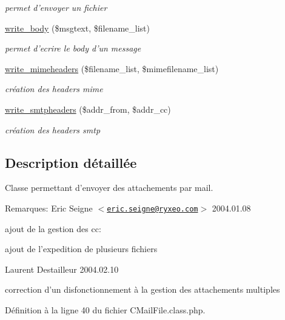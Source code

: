 \begin{CompactItemize}
\begin{CompactList}\small\item\em permet d'envoyer un fichier \item\end{CompactList}\item 
\hyperlink{classCMailFile_a4}{write\_\-body} (\$msgtext, \$filename\_\-list)
\begin{CompactList}\small\item\em permet d'ecrire le body d'un message \item\end{CompactList}\item 
\hyperlink{classCMailFile_a5}{write\_\-mimeheaders} (\$filename\_\-list, \$mimefilename\_\-list)
\begin{CompactList}\small\item\em cr\'{e}ation des headers mime \item\end{CompactList}\item 
\hyperlink{classCMailFile_a6}{write\_\-smtpheaders} (\$addr\_\-from, \$addr\_\-cc)
\begin{CompactList}\small\item\em cr\'{e}ation des headers smtp \item\end{CompactList}\end{CompactItemize}


\subsection{Description d\'{e}taill\'{e}e}
Classe permettant d'envoyer des attachements par mail. 

\begin{Desc}
\item[Remarques:]Eric Seigne $<$\href{mailto:eric.seigne@ryxeo.com}{\tt eric.seigne@ryxeo.com}$>$ 2004.01.08 

ajout de la gestion des cc: 

ajout de l'expedition de plusieurs fichiers

Laurent Destailleur 2004.02.10 

correction d'un disfonctionnement \`{a} la gestion des attachements multiples \end{Desc}




D\'{e}finition \`{a} la ligne 40 du fichier CMail\-File.class.php.

